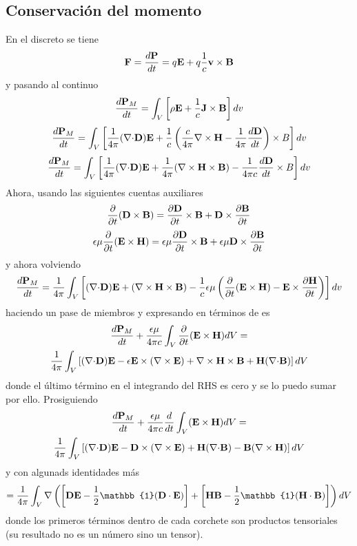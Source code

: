 \documentclass[10pt,oneside]{CBFT_book}
\begin{document}
\subsection{Conservación del momento}

En el discreto se tiene
\[
	\vb{F} = \dtot{\vb{P}}{t} = q\vb{E} + q\frac{1}{c} \pv{v}{B} 
\]
y pasando al continuo
\[
	\dtot{\vb{P}_M}{t} = \int_V \left[ \rho\vb{E} + \frac{1}{c} \pv{J}{B}  \right] dv
\]
\[
	\dtot{\vb{P}_M}{t} = \int_V \left[ \frac{1}{4\pi} (\divem{D}) \vb{E} + 
	\frac{1}{c} \left( \frac{c}{4\pi}\rotorm{H} - \frac{1}{4\pi}\dtot{\vb{D}}{t} \right)\times {B} \right] dv
\]
\[
	\dtot{\vb{P}_M}{t} = \int_V \left[ \frac{1}{4\pi} (\divem{D}) \vb{E} +  
	\frac{1}{4\pi} (\Nabla\times\vb{H}\times\vb{B}) - \frac{1}{4\pi c}\dtot{\vb{D}}{t}\times {B} \right] dv
\]
Ahora, usando las siguientes cuentas auxiliares
\[
	\dpar{}{t}(\pv{D}{B}) = \dpar{\vb{D}}{t}\pv{}{B} + \pv{D}{}\dpar{\vb{B}}{t}
\]
\[
	\epsilon\mu\dpar{}{t}(\pv{E}{H}) = \epsilon\mu\dpar{\vb{D}}{t}\pv{}{B} + \epsilon\mu\pv{D}{}\dpar{\vb{B}}{t}
\]
y ahora volviendo
\[
	\dtot{\vb{P}_M}{t} = \frac{1}{4\pi} \int_V \left[  (\divem{D}) \vb{E} + (\Nabla\times\vb{H}\times\vb{B}) 
	-\frac{1}{c}\epsilon\mu \left( \dpar{}{t}(\pv{E}{H}) - \pv{E}{}\dpar{\vb{H}}{t} \right) \right] dv	
\]
haciendo un pase de miembros y expresando  en términos de  es
\begin{multline*}
	\dtot{\vb{P}_M}{t} + \frac{\epsilon\mu }{4\pi c} \int_V \dpar{}{t}(\pv{E}{H}) dV = \\
	\frac{1}{4\pi} \int_V \left[  (\divem{D}) \vb{E} - \epsilon \pv{E}{}(\Nabla\times\vb{E}) +
	\rotorm{H}\times\vb{B} + \vb{H}(\divem{B}) \right] dV	 
\end{multline*}
donde el último término en el integrando del RHS es cero y se lo puedo sumar por ello.
Prosiguiendo
\begin{multline*}
	\dtot{\vb{P}_M}{t} + \frac{\epsilon\mu }{4\pi c} \dtot{}{t}\int_V (\pv{E}{H}) dV = \\
	\frac{1}{4\pi} \int_V \left[  (\divem{D}) \vb{E} - \pv{D}{}(\Nabla\times\vb{E}) +
	\vb{H}(\divem{B}) - \vb{B}(\rotorm{H}) \right] dV	
\end{multline*}
y con algunads identidades más
\[
	= \frac{1}{4\pi} \int_V \Nabla\left( \left[ \vb{D}\vb{E} - \frac{1}{2}\mathbb{1}( \pe{D}{E}) \right] + 
		\left[ \vb{H}\vb{B} - \frac{1}{2}\mathbb{1}(\pe{H}{B}) \right] \right) dV
\]
donde los primeros términos dentro de cada corchete son productos tensoriales (su resultado no es un
número sino un tensor).
\end{document}
